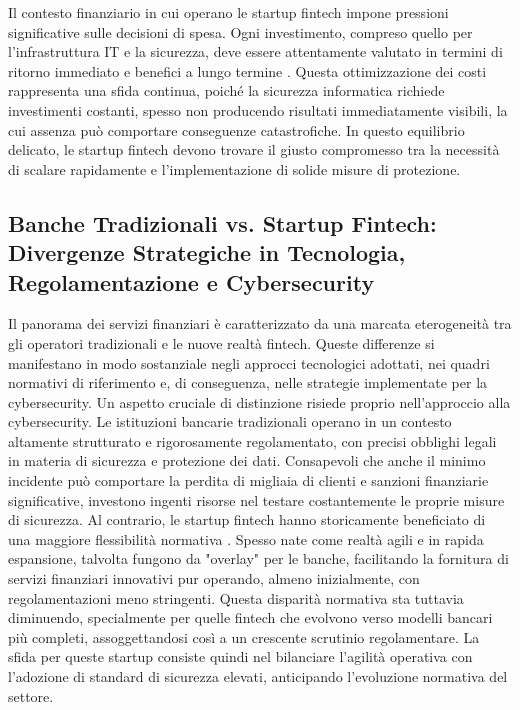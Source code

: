 Il contesto finanziario in cui operano le startup fintech impone pressioni significative sulle decisioni di spesa. Ogni investimento, compreso quello per l'infrastruttura IT e la sicurezza, deve essere attentamente valutato in termini di ritorno immediato e benefici a lungo termine \cite{fintechChallenges}. Questa ottimizzazione dei costi rappresenta una sfida continua, poiché la sicurezza informatica richiede investimenti costanti, spesso non producendo risultati immediatamente visibili, la cui assenza può comportare conseguenze catastrofiche. In questo equilibrio delicato, le startup fintech devono trovare il giusto compromesso tra la necessità di scalare rapidamente e l'implementazione di solide misure di protezione.

\subsection{Banche Tradizionali vs. Startup Fintech: Divergenze Strategiche in Tecnologia, Regolamentazione e Cybersecurity}
Il panorama dei servizi finanziari è caratterizzato da una marcata eterogeneità tra gli operatori tradizionali e le nuove realtà fintech. Queste differenze si manifestano in modo sostanziale negli approcci tecnologici adottati, nei quadri normativi di riferimento e, di conseguenza, nelle strategie implementate per la cybersecurity.
Un aspetto cruciale di distinzione risiede proprio nell'approccio alla cybersecurity. Le istituzioni bancarie tradizionali operano in un contesto altamente strutturato e rigorosamente regolamentato, con precisi obblighi legali in materia di sicurezza e protezione dei dati. Consapevoli che anche il minimo incidente può comportare la perdita di migliaia di clienti e sanzioni finanziarie significative, investono ingenti risorse nel testare costantemente le proprie misure di sicurezza.
Al contrario, le startup fintech hanno storicamente beneficiato di una maggiore flessibilità normativa \cite{bankingVsFintech}. Spesso nate come realtà agili e in rapida espansione, talvolta fungono da "overlay" per le banche, facilitando la fornitura di servizi finanziari innovativi pur operando, almeno inizialmente, con regolamentazioni meno stringenti. Questa disparità normativa sta tuttavia diminuendo, specialmente per quelle fintech che evolvono verso modelli bancari più completi, assoggettandosi così a un crescente scrutinio regolamentare. La sfida per queste startup consiste quindi nel bilanciare l'agilità operativa con l'adozione di standard di sicurezza elevati, anticipando l'evoluzione normativa del settore.
\newline

